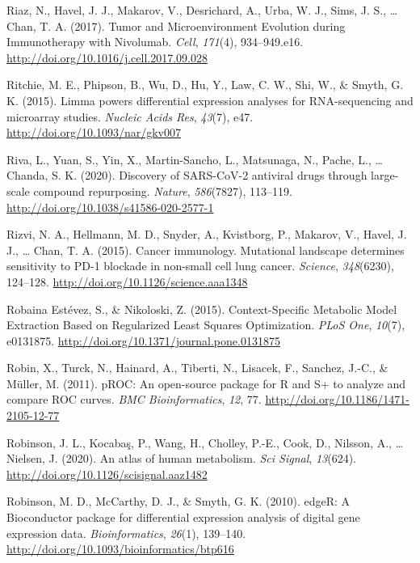 \documentclass[12pt,twoside,openany,\mydriver]{thesis}  %
\begin{document}
\leavevmode\hypertarget{ref-riaz_tumor_2017}{}%
Riaz, N., Havel, J. J., Makarov, V., Desrichard, A., Urba, W. J., Sims, J. S., \ldots{} Chan, T. A. (2017). Tumor and Microenvironment Evolution during Immunotherapy with Nivolumab. \emph{Cell}, \emph{171}(4), 934--949.e16. \url{http://doi.org/10.1016/j.cell.2017.09.028}

\leavevmode\hypertarget{ref-ritchie_limma_2015}{}%
Ritchie, M. E., Phipson, B., Wu, D., Hu, Y., Law, C. W., Shi, W., \& Smyth, G. K. (2015). Limma powers differential expression analyses for RNA-sequencing and microarray studies. \emph{Nucleic Acids Res}, \emph{43}(7), e47. \url{http://doi.org/10.1093/nar/gkv007}

\leavevmode\hypertarget{ref-riva_discovery_2020}{}%
Riva, L., Yuan, S., Yin, X., Martin-Sancho, L., Matsunaga, N., Pache, L., \ldots{} Chanda, S. K. (2020). Discovery of SARS-CoV-2 antiviral drugs through large-scale compound repurposing. \emph{Nature}, \emph{586}(7827), 113--119. \url{http://doi.org/10.1038/s41586-020-2577-1}

\leavevmode\hypertarget{ref-rizvi_cancer_2015}{}%
Rizvi, N. A., Hellmann, M. D., Snyder, A., Kvistborg, P., Makarov, V., Havel, J. J., \ldots{} Chan, T. A. (2015). Cancer immunology. Mutational landscape determines sensitivity to PD-1 blockade in non-small cell lung cancer. \emph{Science}, \emph{348}(6230), 124--128. \url{http://doi.org/10.1126/science.aaa1348}

\leavevmode\hypertarget{ref-robaina_estevez_context-specific_2015}{}%
Robaina Estévez, S., \& Nikoloski, Z. (2015). Context-Specific Metabolic Model Extraction Based on Regularized Least Squares Optimization. \emph{PLoS One}, \emph{10}(7), e0131875. \url{http://doi.org/10.1371/journal.pone.0131875}

\leavevmode\hypertarget{ref-robin_proc_2011}{}%
Robin, X., Turck, N., Hainard, A., Tiberti, N., Lisacek, F., Sanchez, J.-C., \& Müller, M. (2011). pROC: An open-source package for R and S+ to analyze and compare ROC curves. \emph{BMC Bioinformatics}, \emph{12}, 77. \url{http://doi.org/10.1186/1471-2105-12-77}

\leavevmode\hypertarget{ref-robinson_atlas_2020}{}%
Robinson, J. L., Kocabaş, P., Wang, H., Cholley, P.-E., Cook, D., Nilsson, A., \ldots{} Nielsen, J. (2020). An atlas of human metabolism. \emph{Sci Signal}, \emph{13}(624). \url{http://doi.org/10.1126/scisignal.aaz1482}

\leavevmode\hypertarget{ref-robinson_edger_2010}{}%
Robinson, M. D., McCarthy, D. J., \& Smyth, G. K. (2010). edgeR: A Bioconductor package for differential expression analysis of digital gene expression data. \emph{Bioinformatics}, \emph{26}(1), 139--140. \url{http://doi.org/10.1093/bioinformatics/btp616}
\end{document}
